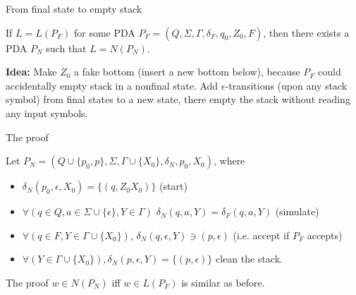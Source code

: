 \documentclass[handout]{beamer}
\begin{document}
\begin{frame}{From final state to empty stack}

    \begin{lemma}
        If $L=L(P_F)$ for some PDA  
        $P_F=(Q,\Sigma,\Gamma,\delta_F,q_0,Z_0,F)$, then there exists a PDA $P_N$ such that $L=N(P_N)$.
    \end{lemma} 
    
    \begin{center}
    \end{center}
    \vspace{-12pt}

    \textbf{Idea:} Make $Z_0$ a fake bottom (insert a new bottom below), because $P_F$ could accidentally empty stack in a nonfinal state. Add $\epsilon$-transitions (upon any stack symbol) from final states to a new state, there empty the stack without reading any input symbols.

\end{frame}


\begin{frame}{The proof}

    Let $P_N=(Q\cup \{p_0,p\},\Sigma,\Gamma\cup\{X_0\},\delta_N,p_0,X_0)$, where
    \begin{itemize}
        \item $\delta_N(p_0,\epsilon,X_0)=\{(q,Z_0X_0)\}$ (start)
        \item $\forall (q\in Q, a \in \Sigma\cup\{\epsilon\},Y\in \Gamma)$ $\delta_N(q,a,Y)=\delta_F(q,a,Y)$ (simulate)
        \item $\forall (q \in F,Y\in \Gamma\cup\{X_0\})$, $\delta_N(q,\epsilon,Y)\ni (p,\epsilon)$ (i.e. accept if $P_F$ accepts)
        \item $\forall (Y\in \Gamma\cup\{X_0\}), \delta_N(p,\epsilon,Y)=\{ (p,\epsilon)\}$ clean the stack.
    \end{itemize}
    The proof $w\in N(P_N)$ iff $w\in L(P_F)$ is similar as before.\hfill\qedsymbol

\end{frame}
\end{document}
